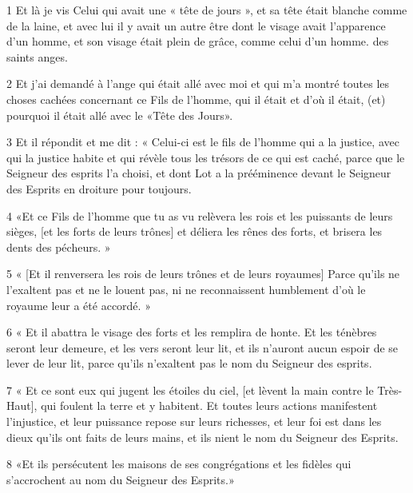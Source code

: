 \par 1 Et là je vis Celui qui avait une « tête de jours », et sa tête était blanche comme de la laine, et avec lui il y avait un autre être dont le visage avait l'apparence d'un homme, et son visage était plein de grâce, comme celui d'un homme. des saints anges.
\par 2 Et j'ai demandé à l'ange qui était allé avec moi et qui m'a montré toutes les choses cachées concernant ce Fils de l'homme, qui il était et d'où il était, (et) pourquoi il était allé avec le «Tête des Jours».
\par 3 Et il répondit et me dit : « Celui-ci est le fils de l'homme qui a la justice, avec qui la justice habite et qui révèle tous les trésors de ce qui est caché, parce que le Seigneur des esprits l'a choisi, et dont Lot a la prééminence devant le Seigneur des Esprits en droiture pour toujours.
\par 4 «Et ce Fils de l'homme que tu as vu relèvera les rois et les puissants de leurs sièges, [et les forts de leurs trônes] et déliera les rênes des forts, et brisera les dents des pécheurs. »
\par 5 « [Et il renversera les rois de leurs trônes et de leurs royaumes] Parce qu'ils ne l'exaltent pas et ne le louent pas, ni ne reconnaissent humblement d'où le royaume leur a été accordé. »
\par 6 « Et il abattra le visage des forts et les remplira de honte. Et les ténèbres seront leur demeure, et les vers seront leur lit, et ils n'auront aucun espoir de se lever de leur lit, parce qu'ils n'exaltent pas le nom du Seigneur des esprits.
\par 7 « Et ce sont eux qui jugent les étoiles du ciel, [et lèvent la main contre le Très-Haut], qui foulent la terre et y habitent. Et toutes leurs actions manifestent l'injustice, et leur puissance repose sur leurs richesses, et leur foi est dans les dieux qu'ils ont faits de leurs mains, et ils nient le nom du Seigneur des Esprits.
\par 8 «Et ils persécutent les maisons de ses congrégations et les fidèles qui s'accrochent au nom du Seigneur des Esprits.»



